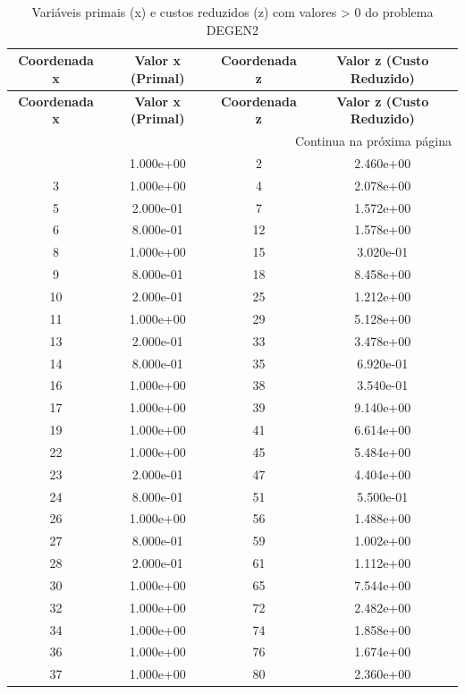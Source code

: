 \documentclass[12pt]{article}
\begin{document}
\begin{longtable}{@{}cccc@{}}
\caption{Variáveis primais (x) e custos reduzidos (z) com valores > 0 do problema DEGEN2} \\
\toprule
\textbf{Coordenada x} & \textbf{Valor x (Primal)} & \textbf{Coordenada z} & \textbf{Valor z (Custo Reduzido)} \\
\midrule
\endfirsthead

\toprule
\textbf{Coordenada x} & \textbf{Valor x (Primal)} & \textbf{Coordenada z} & \textbf{Valor z (Custo Reduzido)} \\
\midrule
\endhead

\midrule \multicolumn{4}{r}{{Continua na próxima página}} \\ \midrule
\endfoot

\bottomrule
\endlastfoot
1 & 1.000e+00 & 2 & 2.460e+00 \\
3 & 1.000e+00 & 4 & 2.078e+00 \\
5 & 2.000e-01 & 7 & 1.572e+00 \\
6 & 8.000e-01 & 12 & 1.578e+00 \\
8 & 1.000e+00 & 15 & 3.020e-01 \\
9 & 8.000e-01 & 18 & 8.458e+00 \\
10 & 2.000e-01 & 25 & 1.212e+00 \\
11 & 1.000e+00 & 29 & 5.128e+00 \\
13 & 2.000e-01 & 33 & 3.478e+00 \\
14 & 8.000e-01 & 35 & 6.920e-01 \\
16 & 1.000e+00 & 38 & 3.540e-01 \\
17 & 1.000e+00 & 39 & 9.140e+00 \\
19 & 1.000e+00 & 41 & 6.614e+00 \\
22 & 1.000e+00 & 45 & 5.484e+00 \\
23 & 2.000e-01 & 47 & 4.404e+00 \\
24 & 8.000e-01 & 51 & 5.500e-01 \\
26 & 1.000e+00 & 56 & 1.488e+00 \\
27 & 8.000e-01 & 59 & 1.002e+00 \\
28 & 2.000e-01 & 61 & 1.112e+00 \\
30 & 1.000e+00 & 65 & 7.544e+00 \\
32 & 1.000e+00 & 72 & 2.482e+00 \\
34 & 1.000e+00 & 74 & 1.858e+00 \\
36 & 1.000e+00 & 76 & 1.674e+00 \\
37 & 1.000e+00 & 80 & 2.360e+00 \\

\end{longtable}
\end{document}
